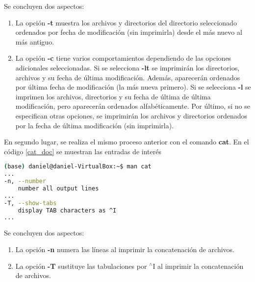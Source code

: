 Se concluyen dos aspectos:
\begin{enumerate}
	\item La opción \textbf{-t} muestra los archivos y directorios del directorio seleccionado ordenados por fecha de modificación (sin imprimirla) desde el más nuevo al más antiguo.
	\item La opción \textbf{-c} tiene varios comportamientos dependiendo de las opciones adicionales seleccionadas. Si se selecciona \textbf{-lt} se imprimirán los directorios, archivos y su fecha de última modificación. Además, aparecerán ordenados por última fecha de modificación (la más nueva primero). Si se selecciona \textbf{-l} se imprimen los archivos, directorios y su fecha de última de última modificación, pero aparecerán ordenados alfabéticamente. Por último, si no se especifican otras opciones, se imprimirán los archivos y directorios ordenados por la fecha de última modificación (sin imprimirla).  
\end{enumerate}
En segundo lugar, se realiza el mismo proceso anterior con el comando \textbf{cat}. En el código \ref{cat_doc} se muestran las entradas de interés
\begin{lstlisting}[language=bash,caption={Documentación del comando cat}, label={cat_doc}]
(base) daniel@daniel-VirtualBox:~$ man cat
...
-n, --number 
	number all output lines
...
-T, --show-tabs
	display TAB characters as ^I
...
\end{lstlisting}
Se concluyen dos aspectos:
\begin{enumerate}
	\item La opción \textbf{-n} numera las líneas al imprimir la concatenación de archivos.
	\item La opción \textbf{-\textrm{T}} sustituye las tabulaciones por $^\wedge \textrm{I}$ al imprimir la concatenación de archivos. 
\end{enumerate}
